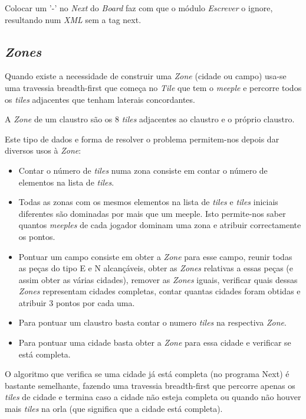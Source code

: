 \documentclass[11pt, a4paper, twoside]{article}
\begin{document}
Colocar um '-' no \emph{Next} do \emph{Board} faz com que o módulo \emph{Escrever} o ignore, resultando num \emph{XML} sem a tag next.

\newpage
\subsection[Zones]{\emph{Zones}}
Quando existe a necessidade de construir uma \emph{Zone} (cidade ou campo) usa-se uma travessia breadth-first que começa no \emph{Tile} que tem o \emph{meeple} e percorre todos os \emph{tiles} adjacentes que tenham laterais concordantes.

A \emph{Zone} de um claustro são os 8 \emph{tiles} adjacentes ao claustro e o próprio claustro.

Este tipo de dados e forma de resolver o problema permitem-nos depois dar diversos usos à \emph{Zone}:

\begin{itemize}
  \item Contar o número de \emph{tiles} numa zona consiste em contar o número de elementos na lista de \emph{tiles}.
  \item Todas as zonas com os mesmos elementos na lista de \emph{tiles} e \emph{tiles} iniciais diferentes são dominadas por mais que um meeple. Isto permite-nos saber quantos \emph{meeples} de cada jogador dominam uma zona e atribuir correctamente os pontos.
  \item Pontuar um campo consiste em obter a \emph{Zone} para esse campo, reunir todas as peças do tipo E e N alcançáveis, obter as \emph{Zones} relativas a essas peças (e assim obter as várias cidades), remover as \emph{Zones} iguais, verificar quais dessas \emph{Zones} representam cidades completas, contar quantas cidades foram obtidas e atribuir 3 pontos por cada uma.
  \item Para pontuar um claustro basta contar o numero \emph{tiles} na respectiva \emph{Zone}.
  \item Para pontuar uma cidade basta obter a \emph{Zone} para essa cidade e verificar se está completa.
\end{itemize}

O algoritmo que verifica se uma cidade já está completa (no programa Next) é bastante semelhante, fazendo uma travessia breadth-first que percorre apenas os \emph{tiles} de cidade e termina caso a cidade não esteja completa ou quando não houver mais \emph{tiles} na orla (que significa que a cidade está completa).

\newpage
\end{document}

